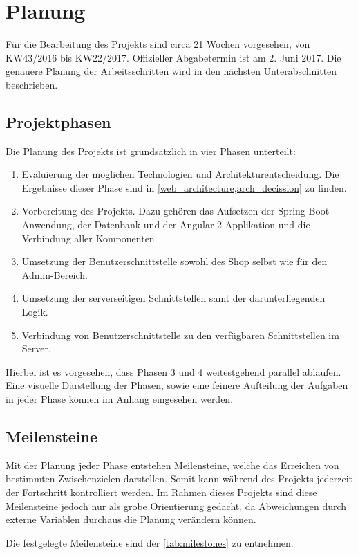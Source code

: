 \section{Planung}
Für die Bearbeitung des Projekts sind circa 21 Wochen vorgesehen, von KW43/2016 bis KW22/2017. Offizieller Abgabetermin ist am 2. Juni 2017. Die genauere Planung der Arbeitsschritten wird in den nächsten Unterabschnitten beschrieben.

\subsection{Projektphasen}
Die Planung des Projekts ist grundsätzlich in vier Phasen unterteilt:
\begin{enumerate}
	\item Evaluierung der möglichen Technologien und Architekturentscheidung. Die Ergebnisse dieser Phase sind in \cref{web_architecture,arch_decission} zu finden.
	\item Vorbereitung des Projekts. Dazu gehören das Aufsetzen der Spring Boot Anwendung, der Datenbank und der Angular 2 Applikation und die Verbindung aller Komponenten.
	\item Umsetzung der  Benutzerschnittstelle sowohl des Shop selbst wie für den Admin-Bereich.
	\item Umsetzung der serverseitigen Schnittstellen samt der darunterliegenden Logik.
	\item Verbindung von Benutzerschnittstelle zu den verfügbaren Schnittstellen im Server.
\end{enumerate}

Hierbei ist es vorgesehen, dass Phasen 3 und 4 weitestgehend parallel ablaufen. Eine visuelle Darstellung der Phasen, sowie eine feinere Aufteilung der Aufgaben in jeder Phase können im Anhang eingesehen werden.

\subsection{Meilensteine}
Mit der Planung jeder Phase entstehen Meilensteine, welche das Erreichen von bestimmten Zwischenzielen darstellen. Somit kann während des Projekts jederzeit der Fortschritt kontrolliert werden. Im Rahmen dieses Projekts sind diese Meilensteine jedoch nur als grobe Orientierung gedacht, da Abweichungen durch externe Variablen durchaus die Planung verändern können.

Die festgelegte Meilensteine sind der \cref{tab:milestones} zu entnehmen.


